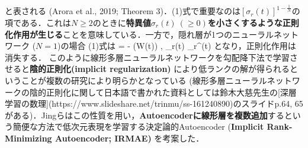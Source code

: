 と表される (Arora et al., 2019; Theorem 3)．(1)式で重要なのは$\left[\sigma_r(t)\right]^{1 - \frac{1}{N}}$の項である．これは$N\geq 2$のときに\textbf{特異値$\sigma_r(t)\ (\geq 0)$を小さくするような正則化作用が生じる}ことを意味している．一方で，隠れ層が1つのニューラルネットワーク ($N=1$)の場合 (1)式は
 = - \left\langle \nabla {}(W(t)) , _r(t) _r^\top(t) \right\rangle
となり，正則化作用は消失する．
このように線形多層ニューラルネットワークを勾配降下法で学習させると\textbf{陰的正則化(implicit regularization)} により低ランクの解が得られるということが複数の研究により明らかとなっている (線形多層ニューラルネットワークの陰的正則化に関して日本語で書かれた資料としては鈴木大慈先生の[深層学習の数理](https://www.slideshare.net/trinmu/ss-161240890)のスライドp.64, 65がある)．Jingらはこの性質を用い，\textbf{Autoencoderに線形層を複数追加}するという簡便な方法で低次元表現を学習する決定論的Autoencoder (\textbf{Implicit Rank-Minimizing Autoencoder; IRMAE)} を考案した．
